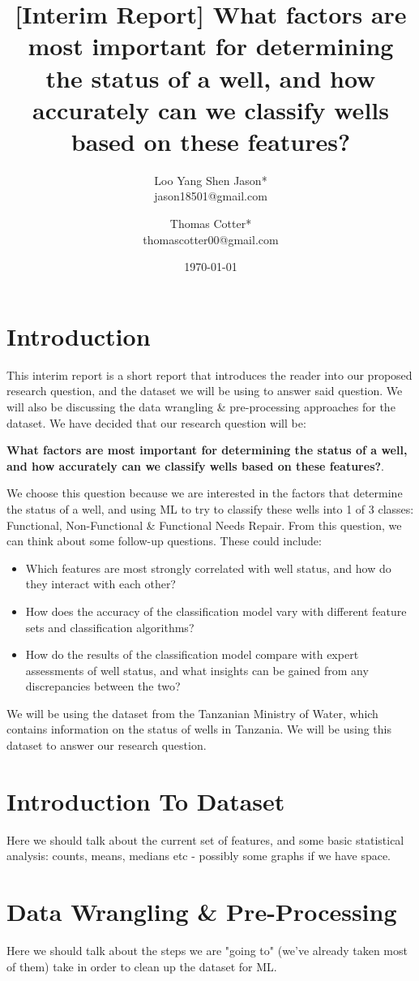 \documentclass{article}
\title{[Interim Report] What factors are most important for determining the status of a well, and how accurately can we classify wells based on these features? }
\author{Loo Yang Shen Jason*\\
        jason18501@gmail.com \and Thomas Cotter*\\
        thomascotter00@gmail.com}
\date{\today}
\begin{document}
    
\maketitle

\section{Introduction}
\label{sec:intro}
This interim report is a short report that introduces the reader into our proposed research question, and the dataset we will be using to answer said question. We will also be discussing the data wrangling \& pre-processing approaches for the dataset. We have decided that our research question will be: 

\textbf{What factors are most important for determining the status of a well, and how accurately can we classify wells based on these features?}. 

We choose this question because we are interested in the factors that determine the status of a well, and using ML to try to classify these wells into 1 of 3 classes: Functional, Non-Functional \& Functional Needs Repair. From this question, we can think about some follow-up questions. These could include:
    \begin{itemize}
        \item Which features are most strongly correlated with well status, and how do they interact with each other?
        \item How does the accuracy of the classification model vary with different feature sets and classification algorithms?
        \item How do the results of the classification model compare with expert assessments of well status, and what insights can be gained from any discrepancies between the two?
    \end{itemize}
 

We will be using the dataset from the Tanzanian Ministry of Water, which contains information on the status of wells in Tanzania. We will be using this dataset to answer our research question.

\section{Introduction To Dataset}

Here we should talk about the current set of features, and some basic statistical analysis: counts, means, medians etc - possibly some graphs if we have space.

\section{Data Wrangling \& Pre-Processing}

Here we should talk about the steps we are "going to" (we've already taken most of them) take in order to clean up the dataset for ML.
\end{document}
